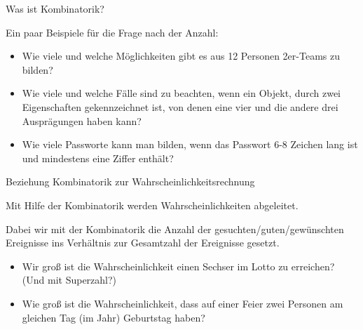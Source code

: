 \documentclass[12pt,ngerman,a4paper,ignorenonframetext,]{beamer}
\providecommand{\tightlist}{%
  \setlength{\itemsep}{0pt}\setlength{\parskip}{0pt}}
\begin{document}
\begin{frame}{Was ist Kombinatorik?}
\protect\hypertarget{was-ist-kombinatorik-1}{}

Ein paar Beispiele für die Frage nach der Anzahl:

\begin{itemize}
\tightlist
\item
  Wie viele und welche Möglichkeiten gibt es aus 12 Personen 2er-Teams
  zu bilden?
\item
  Wie viele und welche Fälle sind zu beachten, wenn ein Objekt, durch
  zwei Eigenschaften gekennzeichnet ist, von denen eine vier und die
  andere drei Ausprägungen haben kann?
\item
  Wie viele Passworte kann man bilden, wenn das Passwort 6-8 Zeichen
  lang ist und mindestens eine Ziffer enthält?
\end{itemize}

\end{frame}

\begin{frame}{Beziehung Kombinatorik zur Wahrscheinlichkeitsrechnung}
\protect\hypertarget{beziehung-kombinatorik-zur-wahrscheinlichkeitsrechnung}{}

Mit Hilfe der Kombinatorik werden Wahrscheinlichkeiten abgeleitet.

Dabei wir mit der Kombinatorik die Anzahl der
gesuchten/guten/gewünschten Ereignisse ins Verhältnis zur Gesamtzahl der
Ereignisse gesetzt.


\begin{Beispiele}

\begin{itemize}
\tightlist
\item
  Wir groß ist die Wahrscheinlichkeit einen Sechser im Lotto zu
  erreichen? (Und mit Superzahl?)
\item
  Wie groß ist die Wahrscheinlichkeit, dass auf einer Feier zwei
  Personen am gleichen Tag (im Jahr) Geburtstag haben?
\end{itemize}

\end{Beispiele}

\end{frame}
\end{document}
